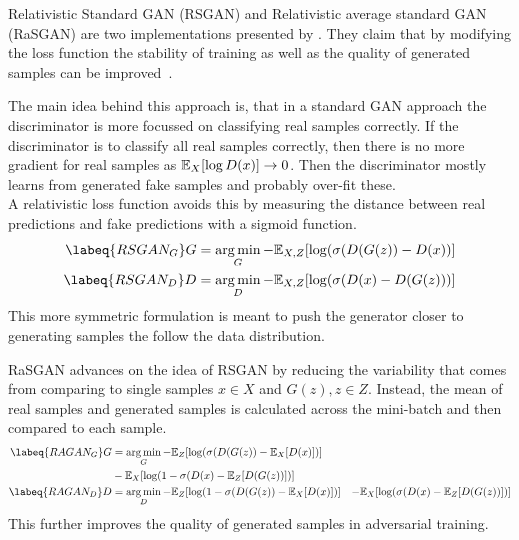 Relativistic Standard GAN (RSGAN) and Relativistic average standard GAN (RaSGAN) are two implementations presented by \citeauthor*{RGAN}.
They claim that by modifying the loss function the stability of training as well as the quality of generated samples can be improved~\cite{RGAN}.

The main idea behind this approach is, that in a standard GAN approach the discriminator is more focussed on classifying real samples correctly.
If the discriminator is to classify all real samples correctly, then there is no more gradient for real samples as $ \mathbb{E}_X[\log D(x)] \rightarrow 0$.
Then the discriminator mostly learns from generated fake samples and probably over-fit these.\\
A relativistic loss function avoids this by measuring the distance between real predictions and fake predictions with a sigmoid function.
\begin{align}
    \labeq{RSGAN_G}
    G & = \argmin_G - \E_{X, Z}[\log(\sigma(D(G(z)) - D(x))] \\
    \labeq{RSGAN_D}
    D & = \argmin_D - \E_{X, Z}[\log(\sigma(D(x) - D(G(z)))]
\end{align}
This more symmetric formulation is meant to push the generator closer to generating samples the follow the data distribution.

RaSGAN advances on the idea of RSGAN by reducing the variability that comes from comparing to single samples $x \in X$ and $G(z), z \in Z$.
Instead, the mean of real samples and generated samples is calculated across the mini-batch and then compared to each sample.
\begin{align}
    \labeq{RAGAN_G}
    G & = \argmin_G - \E_Z[\log(\sigma(D(G(z)) - \E_X[D(x)])] \\
    & - \E_X[\log(1 - \sigma(D(x) - \E_Z[D(G(z))])]\\
    \labeq{RAGAN_D}
    D & = \argmin_D - \E_Z[\log(1 - \sigma(D(G(z)) - \E_X[D(x)])]
    & - \E_X[\log(\sigma(D(x) - \E_Z[D(G(z))])]\\
\end{align}
This further improves the quality of generated samples in adversarial training.

